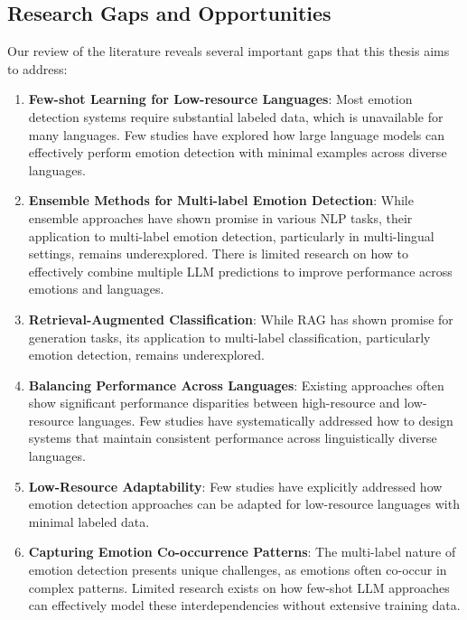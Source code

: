 \documentclass[a4paper,12pt]{extarticle}
\begin{document}
\subsection{Research Gaps and Opportunities}

Our review of the literature reveals several important gaps that this thesis aims to address:

\begin{enumerate}

    \item \textbf{Few-shot Learning for Low-resource Languages}: Most emotion detection systems require substantial labeled data, which is unavailable for many languages. Few studies have explored how large language models can effectively perform emotion detection with minimal examples across diverse languages.
    
    \item \textbf{Ensemble Methods for Multi-label Emotion Detection}: While ensemble approaches have shown promise in various NLP tasks, their application to multi-label emotion detection, particularly in multi-lingual settings, remains underexplored. There is limited research on how to effectively combine multiple LLM predictions to improve performance across emotions and languages.
    
    \item \textbf{Retrieval-Augmented Classification}: While RAG has shown promise for generation tasks, its application to multi-label classification, particularly emotion detection, remains underexplored.

    \item \textbf{Balancing Performance Across Languages}: Existing approaches often show significant performance disparities between high-resource and low-resource languages. Few studies have systematically addressed how to design systems that maintain consistent performance across linguistically diverse languages.
    
    \item \textbf{Low-Resource Adaptability}: Few studies have explicitly addressed how emotion detection approaches can be adapted for low-resource languages with minimal labeled data.

    \item \textbf{Capturing Emotion Co-occurrence Patterns}: The multi-label nature of emotion detection presents unique challenges, as emotions often co-occur in complex patterns. Limited research exists on how few-shot LLM approaches can effectively model these interdependencies without extensive training data.
    
\end{enumerate}
\end{document}
